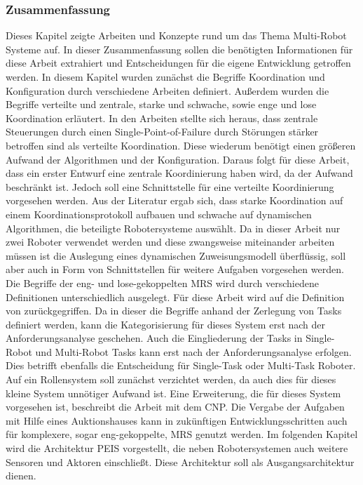 \subsubsection{Zusammenfassung}
Dieses Kapitel zeigte Arbeiten und Konzepte rund um das Thema Multi-Robot Systeme auf. In dieser Zusammenfassung sollen die benötigten Informationen für diese Arbeit extrahiert und Entscheidungen für die eigene Entwicklung getroffen werden. In diesem Kapitel wurden zunächst die Begriffe Koordination und Konfiguration durch verschiedene Arbeiten definiert. Außerdem wurden die Begriffe verteilte und zentrale, starke und schwache, sowie enge und lose Koordination erläutert. In den Arbeiten stellte sich heraus, dass zentrale Steuerungen durch einen Single-Point-of-Failure durch Störungen stärker betroffen sind als verteilte Koordination. Diese wiederum benötigt einen größeren Aufwand der Algorithmen und der Konfiguration. Daraus folgt für diese Arbeit, dass ein erster Entwurf eine zentrale Koordinierung haben wird, da der Aufwand beschränkt ist. Jedoch soll eine Schnittstelle für eine verteilte Koordinierung vorgesehen werden. Aus der Literatur ergab sich, dass starke Koordination auf einem Koordinationsprotokoll aufbauen und schwache auf dynamischen Algorithmen, die beteiligte Robotersysteme auswählt. Da in dieser Arbeit nur zwei Roboter verwendet werden und diese zwangsweise miteinander arbeiten müssen ist die Auslegung eines dynamischen Zuweisungsmodell überflüssig, soll aber auch in Form von Schnittstellen für weitere Aufgaben vorgesehen werden. Die Begriffe der eng- und lose-gekoppelten MRS wird durch verschiedene Definitionen unterschiedlich ausgelegt. Für diese Arbeit wird auf die Definition von \cite{kalra2004hoplites} zurückgegriffen. Da in dieser die Begriffe anhand der Zerlegung von Tasks definiert werden, kann die Kategorisierung für dieses System erst nach der Anforderungsanalyse geschehen. Auch die Eingliederung der Tasks in Single-Robot und Multi-Robot Tasks kann erst nach der Anforderungsanalyse erfolgen. Dies betrifft ebenfalls die Entscheidung für Single-Task oder Multi-Task Roboter. Auf ein Rollensystem soll zunächst verzichtet werden, da auch dies für dieses kleine System unnötiger Aufwand ist. Eine Erweiterung, die für dieses System vorgesehen ist, beschreibt die Arbeit \cite{davis2003negotiation} mit dem CNP. Die Vergabe der Aufgaben mit Hilfe eines Auktionshauses kann in zukünftigen Entwicklungsschritten auch für komplexere, sogar eng-gekoppelte, MRS genutzt werden. Im folgenden Kapitel wird die Architektur PEIS vorgestellt, die neben Robotersystemen auch weitere Sensoren und Aktoren einschließt. Diese Architektur soll als Ausgangsarchitektur dienen.